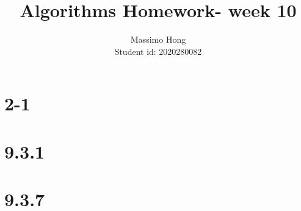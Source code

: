 \documentclass{article}
\title{Algorithms Homework- week 10}
\author{
	Massimo Hong\\
	Student id: 2020280082\\
 }
\begin{document}
\maketitle
\section*{2-1}

\section*{9.3.1}

\section*{9.3.7}

\end{document}
